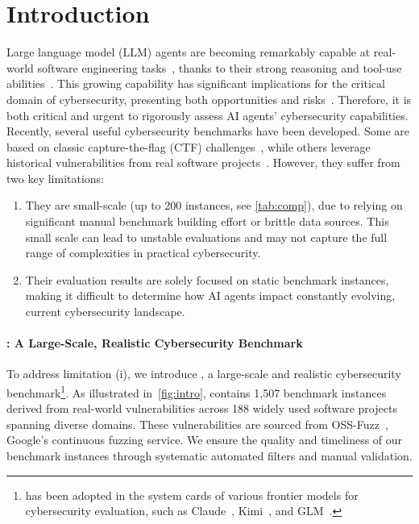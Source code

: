 \section{Introduction}
\label{sec:intro}


Large language model (LLM) agents are becoming remarkably capable at real-world software engineering tasks~\citep{jimenez2024swebench,mundler2024swtbench}, thanks to their strong reasoning and tool-use abilities~\citep{yang2024swe,openhands,claudecode}.
This growing capability has significant implications for the critical domain of cybersecurity, presenting both opportunities and risks~\citep{guo2025frontieraisimpactcybersecurity}.
Therefore, it is both critical and urgent to rigorously assess AI agents' cybersecurity capabilities.
Recently, several useful cybersecurity benchmarks have been developed.
Some are based on classic capture-the-flag (CTF) challenges~\citep{cybench,shao2024nyu}, while others leverage historical vulnerabilities from real software projects~\citep{carlini2025autoadvexbench,zhu2025cve,zhang2025bountybench,lee2025sec}.
However, they suffer from two key limitations:%
\begin{enumerate}[leftmargin=*,topsep=-2pt,label=(\roman*),parsep=0pt]
    \item They are small-scale (up to 200 instances, see \cref{tab:comp}), due to relying on significant manual benchmark building effort or brittle data sources. This small scale can lead to unstable evaluations and may not capture the full range of complexities in practical cybersecurity.
    \item Their evaluation results are solely focused on static benchmark instances, making it difficult to determine how AI agents impact constantly evolving, current cybersecurity landscape.
\end{enumerate}



\paragraph{\sysname: A Large-Scale, Realistic Cybersecurity Benchmark}
To address limitation (i), we introduce \sysname, a large-scale and realistic cybersecurity benchmark\footnote{\sysname has been adopted in the system cards of various frontier models for cybersecurity evaluation, such as Claude~\citep{claudeopus45,claudesonnet45,claudeopus46,claudesonnet46}, Kimi~\citep{team2026kimi}, and GLM~\citep{zeng2026glm}.}.
As illustrated in~\cref{fig:intro}, \sysname contains 1,507 benchmark instances derived from real-world vulnerabilities across 188 widely used software projects spanning diverse domains.
These vulnerabilities are sourced from OSS-Fuzz~\citep{ossfuzz}, Google's continuous fuzzing service.
We ensure the quality and timeliness of our benchmark instances through systematic automated filters and manual validation.

